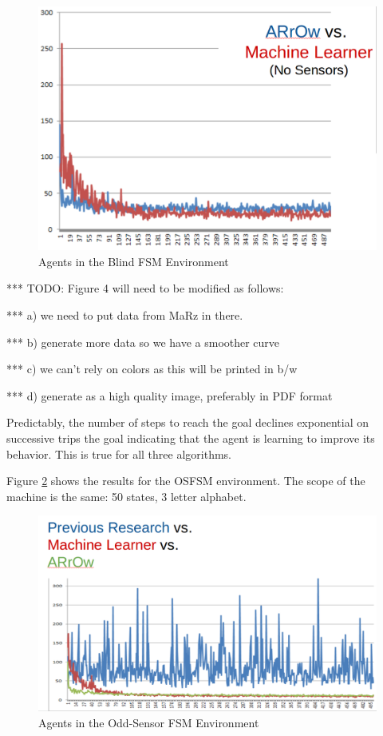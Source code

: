 \documentclass[letterpaper]{article} %
\begin{document}
\begin{figure}[t]
  \centering
  \includegraphics[width=0.9\columnwidth]{BFSMResult.png} %
  \caption{Agents in the Blind FSM Environment}
  \label{fig4}
\end{figure}

*** TODO: Figure 4 will need to be modified as follows:

***    a) we need to put data from MaRz in there.

***    b) generate more data so we have a smoother curve

***    c) we can't rely on colors as this will be printed in b/w

***    d) generate as a high quality image, preferably in PDF format


Predictably, the number of steps to reach the goal declines
exponential on successive trips the goal indicating that the agent is
learning to improve its behavior.  This is true for all three
algorithms.

Figure \ref{fig5} shows the results for the OSFSM environment.  The scope of
the machine is the same: 50 states, 3 letter alphabet.  

\begin{figure}[t]
  \centering
  \includegraphics[width=0.9\columnwidth]{OSFSMResult.png} %
  \caption{Agents in the Odd-Sensor FSM Environment}
  \label{fig5}
\end{figure}
\end{document}
